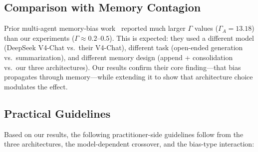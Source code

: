 \documentclass[11pt]{article}
\begin{document}
\subsection{Comparison with Memory Contagion}

Prior multi-agent memory-bias work~\cite{bertalanic2026cost,huang2026cagecal} reported much larger $\Gamma$ values ($\Gamma_A = 13.18$) than our experiments ($\Gamma \approx 0.2$--$0.5$). This is expected: they used a different model (DeepSeek V4-Chat vs.\ their V4-Chat), different task (open-ended generation vs.\ summarization), and different memory design (append + consolidation vs.\ our three architectures). Our results confirm their core finding---that bias propagates through memory---while extending it to show that architecture choice modulates the effect.

\subsection{Practical Guidelines}

Based on our results, the following practitioner-side guidelines follow from the three architectures, the model-dependent crossover, and the bias-type interaction:
\end{document}
